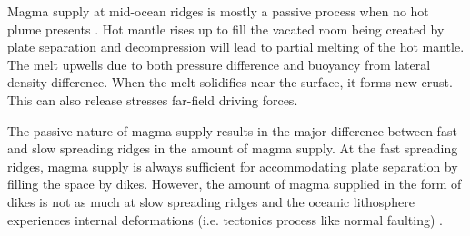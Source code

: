 \documentclass[12pt]{article}
\begin{document}
%

Magma supply at mid-ocean ridges is mostly a passive process when no hot plume presents \citep{Fowler2004}. Hot mantle rises up to fill the vacated room being created by plate separation and decompression will lead to partial melting of the hot mantle. The melt upwells due to both pressure difference and buoyancy from lateral density difference. When the melt solidifies near the surface, it forms new crust. This  can also release  stresses  far-field driving forces.

The passive nature of magma supply results in the major difference between fast and slow spreading ridges in the amount of magma supply. At the fast spreading ridges, magma supply is always sufficient for accommodating plate separation by filling the space by dikes. However, the amount of magma supplied in the form of dikes is not as much at slow spreading ridges and the oceanic lithosphere experiences internal deformations (i.e. tectonics process like normal faulting) . 
\end{document}
